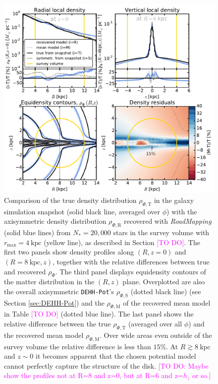 \documentclass[iop,revtex4,numberedappendix,appendixfloats]{emulateapj}
\newcommand{\RM}{{\sl RoadMapping}}
\newcommand{\Wilma}[1]{\textcolor{Magenta}{#1}}
\begin{document}
\begin{figure}[!htbp]
\includegraphics[width=\columnwidth]{fig/MNdHHdiffSph2_4kpc8Spiral_a_test1_density_overview.pdf}
\caption{Comparison of the true density distribution $\rho_{\Phi,\text{T}}$ in the galaxy simulation snapshot (solid black line, averaged over $\phi$) with the axisymmetric density distribution $\rho_{\Phi,\text{R}}$ recovered with \RM{} (solid blue lines) from $N_*=20,000$ stars in the survey volume with $r_\text{max}=4~\text{kpc}$ (yellow line), as described in Section \Wilma{[TO DO]}. The first two panels show density profiles along $(R,z=0)$ and $(R=8~\text{kpc},z)$, together with the relative differences between true and recovered $\rho_{\Phi}$. The third panel displays equidensity contours of the matter distribution in the $(R,z)$ plane. Overplotted are also the overall axisymmetric \texttt{DEHH-Pot}'s $\rho_{\Phi,\text{S}}$ (dotted black line) (see Section \ref{sec:DEHH-Pot}) and the $\rho_{\Phi,\text{M}}$ of the recovered mean model in Table \Wilma{[TO DO]} (dotted blue line). The last panel shows the relative difference between the true $\rho_{\Phi,\text{T}}$ (averaged over all $\phi$) and the recovered mean model $\rho_{\Phi,\text{M}}$. Over wide areas even outside of the survey volume the relative difference is less than $15\%$. At $R\gtrsim8~\text{kpc}$ and $z\sim0$ it becomes apparent that the chosen potential model cannot perfectly capture the structure of the disk. \Wilma{[TO DO: Maybe show the profiles not at R=8 and z=0, but at R=6 and z=$h_z$ or so.]} }
\label{fig:???}
\end{figure}
\end{document}
